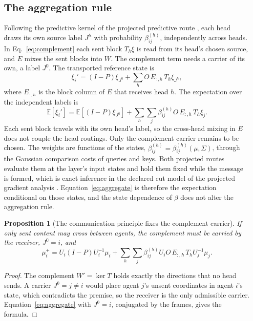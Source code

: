 \documentclass[11pt]{article}
\newtheorem{proposition}{Proposition}
\theoremstyle{definition}
\theoremstyle{remark}
\begin{document}
\subsection{The aggregation rule}

Following the predictive kernel of the projected predictive route \cite{dennis2026projpred}, each head draws its own source label $J^h$ with probability $\beta_{ij}^{(h)}$, independently across heads. In Eq.~\eqref{eq:complement} each sent block $T_h\xi$ is read from its head's chosen source, and $E$ mixes the sent blocks into $W$. The complement term needs a carrier of its own, a label $J^0$. The transported reference state is
\begin{equation}
\xi_i'=(I-P)\xi_{J^0}+\sum_hO\,E_{:,h}\,T_h\xi_{J^h},
\label{eq:transported_state}
\end{equation}
where $E_{:,h}$ is the block column of $E$ that receives head $h$. The expectation over the independent labels is
\begin{equation}
\mathbb E[\xi_i']=\mathbb E[(I-P)\xi_{J^0}]+\sum_h\sum_j\beta_{ij}^{(h)}O\,E_{:,h}\,T_h\xi_j.
\label{eq:aggregate}
\end{equation}
Each sent block travels with its own head's label, so the cross-head mixing in $E$ does not couple the head routings. Only the complement carrier remains to be chosen. The weights are functions of the states, $\beta_{ij}^{(h)}=\beta_{ij}^{(h)}(\mu,\Sigma)$, through the Gaussian comparison costs of queries and keys. Both projected routes evaluate them at the layer's input states and hold them fixed while the message is formed, which is exact inference in the declared cut model of the projected gradient analysis \cite{dennis2026projgrad}. Equation~\eqref{eq:aggregate} is therefore the expectation conditional on those states, and the state dependence of $\beta$ does not alter the aggregation rule.

\begin{proposition}[The communication principle fixes the complement carrier]
\label{prop:self_complement}
If only sent content may cross between agents, the complement must be carried by the receiver, $J^0=i$, and
\begin{equation}
\mu_i^+=U_i(I-P)U_i^{-1}\mu_i+\sum_h\sum_j\beta_{ij}^{(h)}U_iO\,E_{:,h}\,T_hU_j^{-1}\mu_j.
\label{eq:self_complement}
\end{equation}
\end{proposition}

\begin{proof}
The complement $W'=\ker T$ holds exactly the directions that no head sends. A carrier $J^0=j\ne i$ would place agent $j$'s unsent coordinates in agent $i$'s state, which contradicts the premise, so the receiver is the only admissible carrier. Equation~\eqref{eq:aggregate} with $J^0=i$, conjugated by the frames, gives the formula.
\end{proof}
\end{document}
